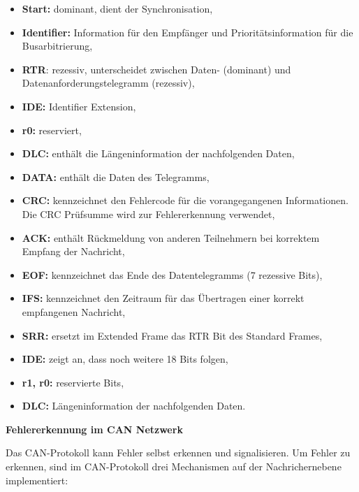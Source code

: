 \begin{itemize}
	\item \textbf{Start:} dominant, dient der Synchronisation,
	\item \textbf{Identifier:} Information für den Empfänger und Prioritätsinformation für die
	Busarbitrierung,
	\item \textbf{RTR}: rezessiv, unterscheidet zwischen Daten- (dominant) und Datenanforderungstelegramm (rezessiv),
	\item \textbf{IDE:} Identifier Extension,
	\item \textbf{r0:} reserviert,
	\item \textbf{DLC:} enthält die Längeninformation der nachfolgenden Daten,
	\item \textbf{DATA:} enthält die Daten des Telegramms,
	\item \textbf{CRC:} kennzeichnet den Fehlercode für die vorangegangenen Informationen. Die CRC
	Prüfsumme wird zur Fehlererkennung verwendet,
	\item \textbf{ACK:} enthält Rückmeldung von anderen Teilnehmern bei korrektem Empfang der
	Nachricht,
	\item \textbf{EOF:} kennzeichnet das Ende des Datentelegramms (7 rezessive Bits),
	\item \textbf{IFS:} kennzeichnet den Zeitraum für das Übertragen einer korrekt empfangenen
	Nachricht,
	\item \textbf{SRR:} ersetzt im Extended Frame das RTR Bit des Standard Frames,
	\item \textbf{IDE:} zeigt an, dass noch weitere 18 Bits folgen,
	\item \textbf{r1, r0:} reservierte Bits,
    \item \textbf{DLC:} Längeninformation der nachfolgenden Daten.
\end{itemize}

\textbf{Fehlererkennung im CAN Netzwerk}

Das CAN-Protokoll kann Fehler selbst erkennen und signalisieren. Um Fehler zu
erkennen, sind im CAN-Protokoll drei Mechanismen auf der Nachrichernebene
implementiert:

